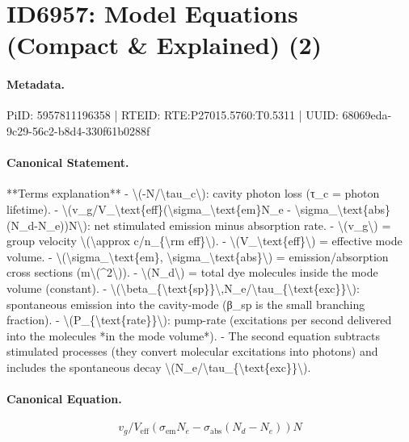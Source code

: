 \section*{ID6957: Model Equations (Compact \& Explained) (2)}
\paragraph{Metadata.}
PiID: 5957811196358 | RTEID: RTE:P27015.5760:T0.5311 | UUID: 68069eda-9c29-56c2-b8d4-330f61b0288f

\paragraph{Canonical Statement.}
**Terms explanation** - \textbackslash{}(-N/\textbackslash{}tau\_c\textbackslash{}): cavity photon loss (τ\_c = photon lifetime). - \textbackslash{}(v\_g/V\_\textbackslash{}text\{eff\}(\textbackslash{}sigma\_\textbackslash{}text\{em\}N\_e - \textbackslash{}sigma\_\textbackslash{}text\{abs\}(N\_d-N\_e))N\textbackslash{}): net stimulated emission minus absorption rate. - \textbackslash{}(v\_g\textbackslash{}) = group velocity \textbackslash{}(\textbackslash{}approx c/n\_\{\textbackslash{}rm eff\}\textbackslash{}). - \textbackslash{}(V\_\textbackslash{}text\{eff\}\textbackslash{}) = effective mode volume. - \textbackslash{}(\textbackslash{}sigma\_\textbackslash{}text\{em\}, \textbackslash{}sigma\_\textbackslash{}text\{abs\}\textbackslash{}) = emission/absorption cross sections (m\textbackslash{}(\textasciicircum{}2\textbackslash{})). - \textbackslash{}(N\_d\textbackslash{}) = total dye molecules inside the mode volume (constant). - \textbackslash{}(\textbackslash{}beta\_\{\textbackslash{}text\{sp\}\}\textbackslash{},N\_e/\textbackslash{}tau\_\{\textbackslash{}text\{exc\}\}\textbackslash{}): spontaneous emission into the cavity-mode (β\_sp is the small branching fraction). - \textbackslash{}(P\_\{\textbackslash{}text\{rate\}\}\textbackslash{}): pump-rate (excitations per second delivered into the molecules *in the mode volume*). - The second equation subtracts stimulated processes (they convert molecular excitations into photons) and includes the spontaneous decay \textbackslash{}(N\_e/\textbackslash{}tau\_\{\textbackslash{}text\{exc\}\}\textbackslash{}).

\paragraph{Canonical Equation.}
\[
v_g/V_\text{eff}(\sigma_\text{em}N_e - \sigma_\text{abs}(N_d-N_e))N
\]

